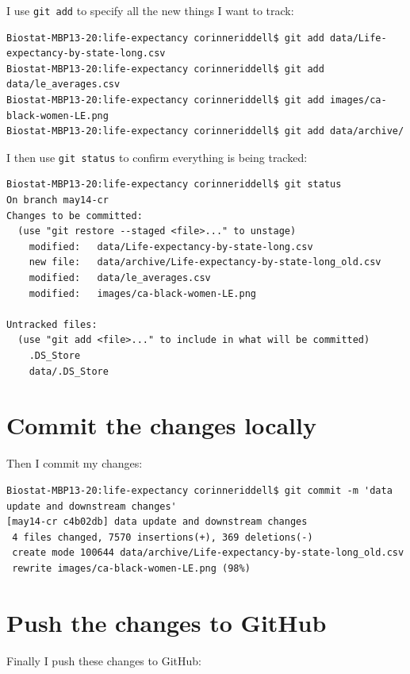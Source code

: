 \documentclass[
]{book}
\begin{document}
I use \texttt{git\ add} to specify all the new things I want to track:

\begin{verbatim}
Biostat-MBP13-20:life-expectancy corinneriddell$ git add data/Life-expectancy-by-state-long.csv 
Biostat-MBP13-20:life-expectancy corinneriddell$ git add data/le_averages.csv 
Biostat-MBP13-20:life-expectancy corinneriddell$ git add images/ca-black-women-LE.png 
Biostat-MBP13-20:life-expectancy corinneriddell$ git add data/archive/
\end{verbatim}

I then use \texttt{git\ status} to confirm everything is being tracked:

\begin{verbatim}
Biostat-MBP13-20:life-expectancy corinneriddell$ git status
On branch may14-cr
Changes to be committed:
  (use "git restore --staged <file>..." to unstage)
    modified:   data/Life-expectancy-by-state-long.csv
    new file:   data/archive/Life-expectancy-by-state-long_old.csv
    modified:   data/le_averages.csv
    modified:   images/ca-black-women-LE.png

Untracked files:
  (use "git add <file>..." to include in what will be committed)
    .DS_Store
    data/.DS_Store
\end{verbatim}

\hypertarget{commit-the-changes-locally-1}{%
\section{Commit the changes locally}\label{commit-the-changes-locally-1}}

Then I commit my changes:

\begin{verbatim}
Biostat-MBP13-20:life-expectancy corinneriddell$ git commit -m 'data update and downstream changes'
[may14-cr c4b02db] data update and downstream changes
 4 files changed, 7570 insertions(+), 369 deletions(-)
 create mode 100644 data/archive/Life-expectancy-by-state-long_old.csv
 rewrite images/ca-black-women-LE.png (98%)
\end{verbatim}

\hypertarget{push-the-changes-to-github}{%
\section{Push the changes to GitHub}\label{push-the-changes-to-github}}

Finally I push these changes to GitHub:
\end{document}

